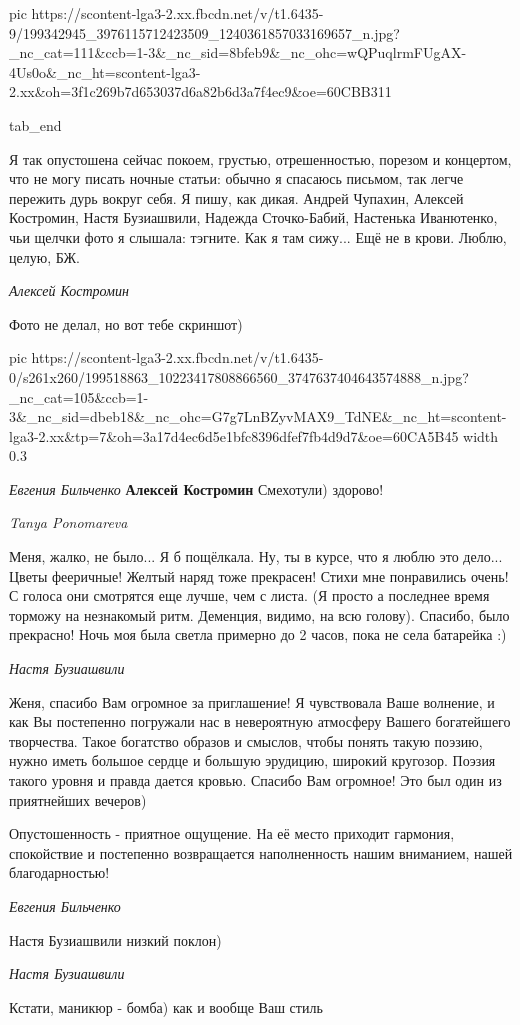      pic https://scontent-lga3-2.xx.fbcdn.net/v/t1.6435-9/199342945_3976115712423509_1240361857033169657_n.jpg?_nc_cat=111&ccb=1-3&_nc_sid=8bfeb9&_nc_ohc=wQPuqlrmFUgAX-4Us0o&_nc_ht=scontent-lga3-2.xx&oh=3f1c269b7d653037d6a82b6d3a7f4ec9&oe=60CBB311

  tab_end
\fi

Я так опустошена сейчас покоем, грустью, отрешенностью, порезом и концертом,
что не могу писать ночные статьи: обычно я спасаюсь письмом, так легче пережить
дурь вокруг себя. Я пишу, как дикая. Андрей Чупахин, Алексей Костромин, Настя
Бузиашвили, Надежда Сточко-Бабий, Настенька Иванютенко, чьи щелчки фото я
слышала: тэгните. Как я там сижу... Ещё не в крови. Люблю, целую, БЖ.

\emph{Алексей Костромин}

Фото не делал, но вот тебе скриншот)

\ifcmt
  pic https://scontent-lga3-2.xx.fbcdn.net/v/t1.6435-0/s261x260/199518863_10223417808866560_3747637404643574888_n.jpg?_nc_cat=105&ccb=1-3&_nc_sid=dbeb18&_nc_ohc=G7g7LnBZyvMAX9_TdNE&_nc_ht=scontent-lga3-2.xx&tp=7&oh=3a17d4ec6d5e1bfc8396dfef7fb4d9d7&oe=60CA5B45
	width 0.3
\fi

\emph{Евгения Бильченко}
\textbf{Алексей Костромин} Смехотули) здорово!

\emph{Tanya Ponomareva}

Меня, жалко, не было... Я б пощёлкала. Ну, ты в курсе, что я люблю это дело...
Цветы фееричные! Желтый наряд тоже прекрасен! Стихи мне понравились очень! С
голоса они смотрятся еще лучше, чем с листа. (Я просто а последнее время
торможу на незнакомый ритм. Деменция, видимо, на всю голову). Спасибо, было
прекрасно! Ночь моя была светла примерно до 2 часов, пока не села батарейка :)

\emph{Настя Бузиашвили}

Женя, спасибо Вам огромное за приглашение! Я чувствовала Ваше волнение, и как
Вы постепенно погружали нас в невероятную атмосферу Вашего богатейшего
творчества. Такое богатство образов и смыслов, чтобы понять такую поэзию, нужно
иметь большое сердце и большую эрудицию, широкий кругозор. Поэзия такого уровня
и правда дается кровью. Спасибо Вам огромное! Это был один из приятнейших
вечеров)

Опустошенность - приятное ощущение. На её место приходит гармония, спокойствие
и постепенно возвращается наполненность нашим вниманием, нашей благодарностью!

\emph{Евгения Бильченко}

Настя Бузиашвили низкий поклон)

\emph{Настя Бузиашвили}

Кстати, маникюр - бомба) как и вообще Ваш стиль

